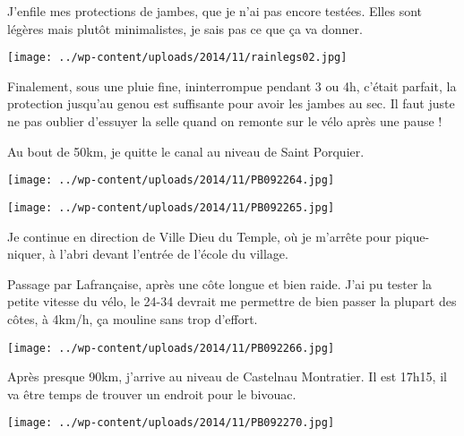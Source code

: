  J'enfile mes protections de jambes, que je n'ai pas encore testées. Elles sont légères mais plutôt minimalistes, je sais pas ce que ça va donner.

 

\begin{center} \texttt{[image: ../wp-content/uploads/2014/11/rainlegs02.jpg]} \end{center}

Finalement, sous une pluie fine, ininterrompue pendant 3 ou 4h, c'était parfait, la protection jusqu'au genou est suffisante pour avoir les jambes au sec. Il faut juste ne pas oublier d'essuyer la selle quand on remonte sur le vélo après une pause !

 Au bout de 50km, je quitte le canal au niveau de Saint Porquier.

 

\begin{center} \texttt{[image: ../wp-content/uploads/2014/11/PB092264.jpg]} \end{center}



 

\begin{center} \texttt{[image: ../wp-content/uploads/2014/11/PB092265.jpg]} \end{center}



 Je continue en direction de Ville Dieu du Temple, où je m'arrête pour pique-niquer, à l'abri devant l'entrée de l'école du village.

 Passage par Lafrançaise, après une côte longue et bien raide. J'ai pu tester la petite vitesse du vélo, le 24-34 devrait me permettre de bien passer la plupart des côtes, à 4km/h, ça mouline sans trop d'effort.

 

\begin{center} \texttt{[image: ../wp-content/uploads/2014/11/PB092266.jpg]} \end{center}



 Après presque 90km, j'arrive au niveau de Castelnau Montratier. Il est 17h15, il va être temps de trouver un endroit pour le bivouac.

 

\begin{center} \texttt{[image: ../wp-content/uploads/2014/11/PB092270.jpg]} \end{center}



